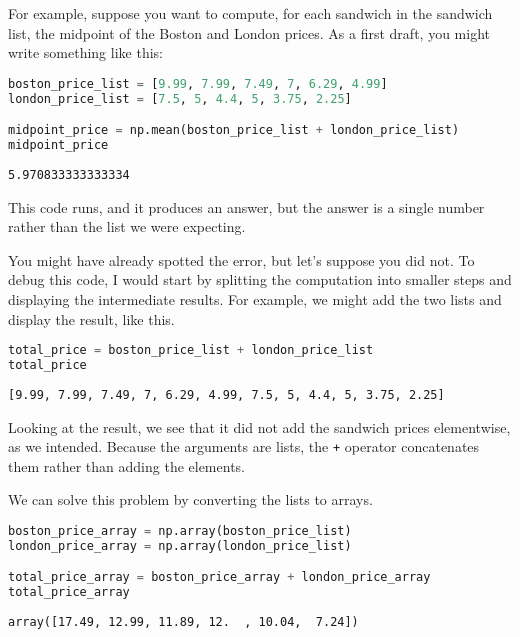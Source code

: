 For example, suppose you want to compute, for each sandwich in the
sandwich list, the midpoint of the Boston and London prices. As a first
draft, you might write something like this:

\begin{lstlisting}[language=Python,style=source]
boston_price_list = [9.99, 7.99, 7.49, 7, 6.29, 4.99]
london_price_list = [7.5, 5, 4.4, 5, 3.75, 2.25]

midpoint_price = np.mean(boston_price_list + london_price_list)
midpoint_price
\end{lstlisting}

\begin{lstlisting}[style=output]
5.970833333333334
\end{lstlisting}

This code runs, and it produces an answer, but the answer is a single
number rather than the list we were expecting.

You might have already spotted the error, but let's suppose you did not.
To debug this code, I would start by splitting the computation into
smaller steps and displaying the intermediate results. For example, we
might add the two lists and display the result, like this.

\begin{lstlisting}[language=Python,style=source]
total_price = boston_price_list + london_price_list
total_price
\end{lstlisting}

\begin{lstlisting}[style=output]
[9.99, 7.99, 7.49, 7, 6.29, 4.99, 7.5, 5, 4.4, 5, 3.75, 2.25]
\end{lstlisting}

Looking at the result, we see that it did not add the sandwich prices
elementwise, as we intended. Because the arguments are lists, the
\passthrough{\lstinline!+!} operator concatenates them rather than
adding the elements.

We can solve this problem by converting the lists to arrays.

\begin{lstlisting}[language=Python,style=source]
boston_price_array = np.array(boston_price_list)
london_price_array = np.array(london_price_list)

total_price_array = boston_price_array + london_price_array
total_price_array
\end{lstlisting}

\begin{lstlisting}[style=output]
array([17.49, 12.99, 11.89, 12.  , 10.04,  7.24])
\end{lstlisting}

